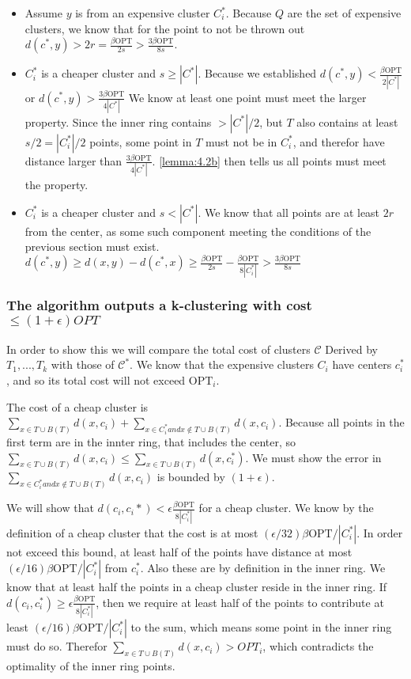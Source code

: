 \documentclass[paper=a4, fontsize=10.5pt]{scrartcl} %
\numberwithin{equation}{section} %
\numberwithin{figure}{section} %
\numberwithin{table}{section} %
\begin{document}
\begin{itemize}

\item Assume $y$ is from an expensive cluster $C^*_i$. Because $Q$ are the set of expensive clusters, we know that for the point to not be thrown out $d(c^*, y) > 2r = \frac{\beta\text{OPT}}{2s} > \frac{3\beta\text{OPT}}{8s}$.

\item $C^*_i$ is a cheaper cluster and $s \geq |C^*|$. Because we established $d(c^*, y) < \frac{\beta \text{OPT}}{2|C^*|}$ or $d(c^*, y) > \frac{3 \beta \text{OPT}}{4|C^*|}$ We know at least one point must meet the larger property. Since the inner ring contains $> |C^*|/2$, but $T$ also contains at least $s/2 = |C^*_i|/2$ points, some point in $T$ must not be in $C^*_i$, and therefor have distance larger than $\frac{3 \beta \text{OPT}}{4|C^*|}$. \ref{lemma:4.2b} then tells us all points must meet the property.

\item $C^*_i$ is a cheaper cluster and $s < |C^*|$. We know that all points are at least $2r$ from the center, as some such component meeting the conditions of the previous section must exist. $d(c^*, y) \geq d(x, y) - d(c^*, x) \geq \frac{\beta\text{OPT}}{2s} - \frac{\beta\text{OPT}}{8|C^*_i|} > \frac{3\beta\text{OPT}}{8s}$
\end{itemize}

\subsubsection{The algorithm outputs a k-clustering with cost $\leq (1+\epsilon)OPT$}

In order to show this we will compare the total cost of clusters $\mathcal{C}$ Derived by $T_1, ..., T_k$ with those of $\mathcal{C}^*$. We know that the expensive clusters $C_i$ have centers $c_i^*$, and so its total cost will not exceed $\text{OPT}_i$.

The cost of a cheap cluster is $\sum\limits_{x\in T\cup B(T)}d(x, c_i) + \sum\limits_{x \in C_i^* and x\notin T\cup B(T)}d(x, c_i)$. Because all points in the first term are in the innter ring, that includes the center, so $\sum\limits_{x\in T\cup B(T)}d(x, c_i) \leq \sum\limits_{x\in T\cup B(T)}d(x, c^*_i)$. We must show the error in $\sum\limits_{x \in C_i^* and x\notin T\cup B(T)}d(x, c_i)$ is bounded by $(1+\epsilon)$.

We will show that $d(c_i, c_i*) < \epsilon\frac{\beta\text{OPT}}{8|C_i^*|}$ for a cheap cluster. We know by the definition of a cheap cluster that the cost is at most $(\epsilon/32)\beta\text{OPT}/|C_i^*|$. In order not exceed this bound, at least half of the points have distance at most $(\epsilon/16)\beta\text{OPT}/|C_i^*|$ from $c_i^*$. Also these are by definition in the inner ring. We know that at least half the points in a cheap cluster reside in the inner ring. If $d(c_i, c_i^*)  \geq \epsilon\frac{\beta\text{OPT}}{8|C_i^*|}$, then we require at least half of the points to contribute at least $(\epsilon/16)\beta\text{OPT}/|C_i^*|$ to the sum, which means some point in the inner ring must do so. Therefor $\sum\limits_{x\in T\cup B(T)}d(x, c_i)> OPT_i$, which contradicts the optimality of the inner ring points. 
\end{document}
